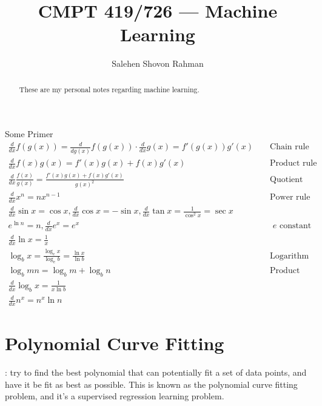 \documentclass{tufte-handout}
\title{CMPT 419/726 --- Machine Learning}
\author[Salehen Shovon Rahman]{Salehen Shovon Rahman}
\begin{document}
\maketitle%

\begin{abstract}
\noindent
These are my personal notes regarding machine learning.
\end{abstract}


\begin{fullwidth}
  \begin{tcolorbox}
    Some Primer
    \begin{align}
      \frac{d}{dx}f(g(x)) = \frac{d}{d{g(x)}}f(g(x))\cdot\frac{d}{dx}g(x) = f'(g(x))g'(x) &  & \text{ Chain rule} \\
      \frac{d}{dx}f(x)g(x) = f'(x)g(x) + f(x)g'(x) & & \text{ Product rule} \\
      \frac{d}{dx}\frac{f(x)}{g(x)} = \frac{f'(x)g(x) + f(x)g'(x)}{g(x)^2} & & \text{ Quotient rule} \\
      \frac{d}{dx}x^n = nx^{n - 1} & & \text{ Power rule} \\
      \frac{d}{dx}\sin x = \cos x, \frac{d}{dx}\cos x = -\sin x, \frac{d}{dx}\tan x = \frac{1}{\cos^2x} = \sec x & & \\
      e^{\ln n} = n, \frac{d}{dx}e^x = e^x & & \text{ $e$ constant properties} \\
      \frac{d}{dx}\ln x = \frac{1}{x} & & \\
      \log_bx = \frac{\log_ex}{\log_eb} = \frac{\ln x}{\ln b} & & \text{ Logarithm identity} \\
      \log_bmn = \log_bm + \log_bn & & \text{ Product inside logarithms} \\
      \frac{d}{dx}\log_bx = \frac{1}{x\ln b} & & \\
      \frac{d}{dx}n^x = n^x\ln n & &
    \end{align}
  \end{tcolorbox}
\end{fullwidth}

\section{Polynomial Curve Fitting}\label{sec:polynomial-curve-fitting}

: try to find the best
polynomial that can potentially fit a set of data points, and have it be fit as
best as possible. This is known as the polynomial curve fitting problem, and
it's a supervised regression learning problem.
\end{document}
